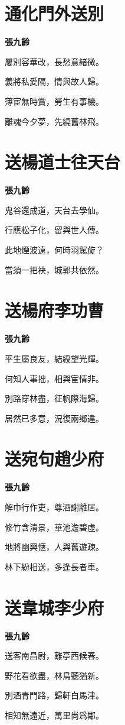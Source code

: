 \documentclass[12pt,a4paper]{ctexbook}
\begin{document}
\section{通化門外送別}
\textbf{張九齡}\par\vspace{0.5em}
屢別容華改，長愁意緒微。\par
義將私愛隔，情與故人歸。\par
薄宦無時賞，勞生有事機。\par
離魂今夕夢，先繞舊林飛。\par

\section{送楊道士往天台}
\textbf{張九齡}\par\vspace{0.5em}
鬼谷還成道，天台去學仙。\par
行應松子化，留與世人傳。\par
此地煙波遠，何時羽駕旋？\par
當須一把袂，城郭共依然。\par

\section{送楊府李功曹}
\textbf{張九齡}\par\vspace{0.5em}
平生屬良友，結綬望光輝。\par
何知人事拙，相與宦情非。\par
別路穿林盡，征帆際海歸。\par
居然已多意，況復兩鄉違。\par

\section{送宛句趙少府}
\textbf{張九齡}\par\vspace{0.5em}
解巾行作吏，尊酒謝離居。\par
修竹含清景，華池澹碧虛。\par
地將幽興愜，人與舊遊疎。\par
林下紛相送，多逢長者車。\par

\section{送韋城李少府}
\textbf{張九齡}\par\vspace{0.5em}
送客南昌尉，離亭西候春。\par
野花看欲盡，林鳥聽猶新。\par
別酒青門路，歸軒白馬津。\par
相知無遠近，萬里尚爲鄰。\par
\end{document}
